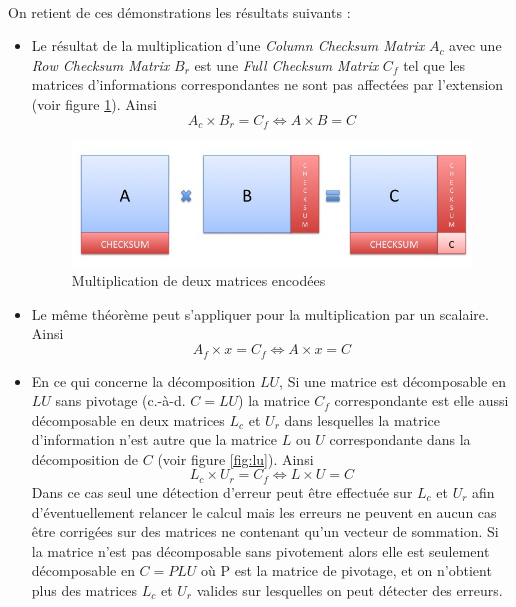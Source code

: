 \documentclass[a4paper, 10pt]{report}
\begin{document}
\paragraph*{}
On retient de ces démonstrations les résultats suivants :
\begin{itemize}
 \item Le résultat de la multiplication d’une \textit{Column Checksum Matrix} $A_c$ avec une \textit{Row Checksum Matrix}
       $B_r$ est une \textit{Full Checksum Matrix} $C_f$ tel que les matrices d’informations correspondantes ne sont pas 
       affectées par l’extension (voir figure \ref{fig:mult}). Ainsi \[ A_c \times B_r = C_f \Leftrightarrow A \times B = C \]
\begin{figure}
 \center
 \includegraphics[scale=0.45]{Multiplication.jpg}
 \caption{Multiplication de deux matrices encodées}
  \label{fig:mult}
\end{figure}
 \item Le même théorème peut s’appliquer pour la multiplication par un scalaire. Ainsi
       \[ A_f \times x = C_f \Leftrightarrow A \times x = C \]
 \item En ce qui concerne la décomposition $LU$, Si une matrice est décomposable en $LU$ sans pivotage 
       (c.-à-d. $C = LU$) la matrice $C_f$ correspondante est elle aussi décomposable en deux matrices $L_c$ 
       et $U_r$ dans lesquelles la matrice d’information n’est autre que la matrice $L$ ou $U$ correspondante 
       dans la décomposition de $C$ (voir figure \ref{fig:lu}).
       Ainsi \[ L_c \times U_r = C_f \Leftrightarrow L \times U = C \]
       Dans ce cas seul une détection d'erreur peut \^etre effectuée sur $L_c$ 
       et $U_r$ afin d'éventuellement relancer le calcul mais les erreurs ne peuvent en aucun cas \^etre corrigées sur des matrices ne contenant qu'un
       vecteur de sommation.
       Si la matrice n'est pas décomposable sans pivotement alors elle est seulement décomposable en $C = PLU$ o\`u P est la matrice de pivotage,
       et on n'obtient plus des matrices $L_c$ et $U_r$ valides sur lesquelles on peut détecter des erreurs.\newline

\end{itemize}
\end{document}
